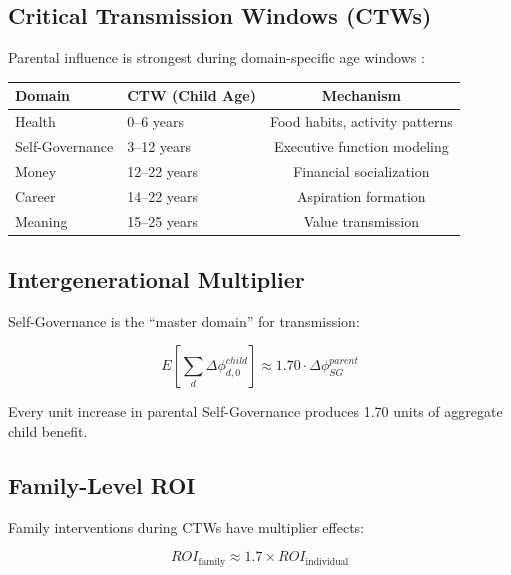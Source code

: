 \subsection{Critical Transmission Windows (CTWs)}

Parental influence is strongest during domain-specific age windows \citep{heckman2008schools, cunha2010estimating, turkheimer2003socioeconomic}:

\begin{center}
\small
\begin{tabular}{@{}llc@{}}
\toprule
\textbf{Domain} & \textbf{CTW (Child Age)} & \textbf{Mechanism} \\
\midrule
Health & 0--6 years & Food habits, activity patterns \\
Self-Governance & 3--12 years & Executive function modeling \\
Money & 12--22 years & Financial socialization \\
Career & 14--22 years & Aspiration formation \\
Meaning & 15--25 years & Value transmission \\
\bottomrule
\end{tabular}
\end{center}

\subsection{Intergenerational Multiplier}

Self-Governance is the ``master domain'' for transmission:

\begin{equation}
\boxed{
E\left[\sum_{d} \Delta\phi^{child}_{d,0}\right] \approx 1.70 \cdot \Delta\phi^{parent}_{SG}
}
\end{equation}

Every unit increase in parental Self-Governance produces 1.70 units of aggregate child benefit.

\subsection{Family-Level ROI}

Family interventions during CTWs have multiplier effects:

\begin{equation}
\boxed{
ROI_{\text{family}} \approx 1.7 \times ROI_{\text{individual}}
}
\end{equation}

